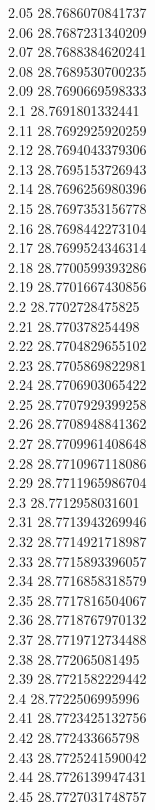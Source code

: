 {2.05	28.7686070841737\\
2.06	28.7687231340209\\
2.07	28.7688384620241\\
2.08	28.7689530700235\\
2.09	28.7690669598333\\
2.1	28.7691801332441\\
2.11	28.7692925920259\\
2.12	28.7694043379306\\
2.13	28.7695153726943\\
2.14	28.7696256980396\\
2.15	28.7697353156778\\
2.16	28.7698442273104\\
2.17	28.7699524346314\\
2.18	28.7700599393286\\
2.19	28.7701667430856\\
2.2	28.7702728475825\\
2.21	28.770378254498\\
2.22	28.7704829655102\\
2.23	28.7705869822981\\
2.24	28.7706903065422\\
2.25	28.7707929399258\\
2.26	28.7708948841362\\
2.27	28.7709961408648\\
2.28	28.7710967118086\\
2.29	28.7711965986704\\
2.3	28.7712958031601\\
2.31	28.7713943269946\\
2.32	28.7714921718987\\
2.33	28.7715893396057\\
2.34	28.7716858318579\\
2.35	28.7717816504067\\
2.36	28.7718767970132\\
2.37	28.7719712734488\\
2.38	28.772065081495\\
2.39	28.7721582229442\\
2.4	28.7722506995996\\
2.41	28.7723425132756\\
2.42	28.772433665798\\
2.43	28.7725241590042\\
2.44	28.7726139947431\\
2.45	28.7727031748757\\
}

